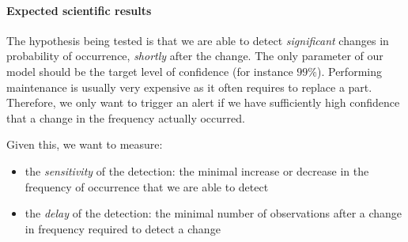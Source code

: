 \documentclass{kththesis}
\begin{document}
%
%


\paragraph*{Expected scientific results}

The hypothesis being tested is that we are able to detect \emph{significant} changes in probability of occurrence, \emph{shortly} after the change. 
The only parameter of our model should be the target level of confidence (for instance $99\%$). Performing maintenance is usually very expensive as it often requires to replace a part. Therefore, we only want to trigger an alert if we have sufficiently high  confidence that a change in the frequency actually occurred.

Given this, we want to measure:

\begin{itemize}

\item the \emph{sensitivity} of the detection: the minimal increase or decrease in the frequency of occurrence that we are able to detect
\item the \emph{delay} of the detection: the minimal number of observations after a change in frequency  required to detect a change

\end{itemize}


\end{document}
